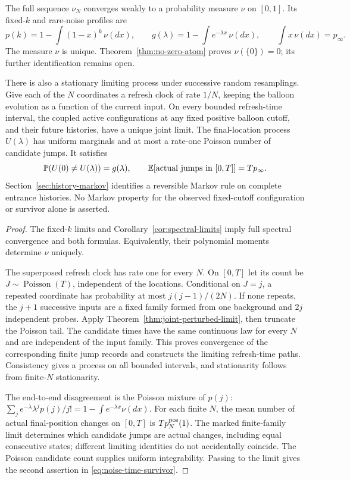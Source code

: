 \documentclass[11pt,letterpaper]{article}
\newcommand{\PP}{\mathbb P}\newcommand{\EE}{\mathbb E}
\begin{document}
\begin{corollary}
\label{cor:noise-evolution}
The full sequence $\nu_N$ converges weakly to a probability measure
$\nu$ on $[0,1]$. Its fixed-$k$ and rare-noise profiles are
\[
 p(k)=1-\int(1-x)^k\,\nu(dx),\qquad
 g(\lambda)=1-\int e^{-\lambda x}\,\nu(dx),\qquad
 \int x\,\nu(dx)=p_\infty.
\]
The measure $\nu$ is unique. Theorem~\ref{thm:no-zero-atom} proves
$\nu(\{0\})=0$; its further identification remains open.

There is also a stationary limiting process under successive random
resamplings. Give each of the $N$ coordinates a refresh clock of rate
$1/N$, keeping the balloon evolution as a function of the current
input. On every bounded refresh-time interval, the coupled active
configurations at any fixed positive balloon cutoff, and their future
histories, have a unique joint limit. The final-location process
$U(\lambda)$ has uniform marginals and at most a rate-one Poisson
number of candidate jumps. It satisfies
\begin{equation}\label{eq:noise-time-survivor}
 \PP(U(0)\ne U(\lambda))=g(\lambda),\qquad
 \EE[\hbox{actual jumps in }[0,T]]=Tp_\infty.
\end{equation}
Section~\ref{sec:history-markov} identifies a reversible Markov rule
on complete entrance histories. No Markov property for the observed
fixed-cutoff configuration or survivor alone is asserted.
\end{corollary}
\begin{proof}
The fixed-$k$ limits and Corollary~\ref{cor:spectral-limits} imply full
spectral convergence and both formulas. Equivalently, their polynomial
moments determine $\nu$ uniquely.

The superposed refresh clock has rate one for every $N$. On $[0,T]$
let its count be $J\sim\operatorname{Poisson}(T)$, independent of the
locations. Conditional on $J=j$, a repeated coordinate has probability
at most $j(j-1)/(2N)$. If none repeats, the $j+1$ successive inputs
are a fixed family formed from one background and $2j$ independent
probes. Apply Theorem~\ref{thm:joint-perturbed-limit}, then truncate
the Poisson tail. The candidate times have the same continuous law
for every $N$ and are independent of the input family. This proves
convergence of the corresponding finite jump records and constructs
the limiting refresh-time paths. Consistency gives a process on all
bounded intervals, and stationarity follows from finite-$N$ stationarity.

The end-to-end disagreement is the Poisson mixture of $p(j)$:
$\sum_j e^{-\lambda}\lambda^j p(j)/j!
=1-\int e^{-\lambda x}\nu(dx)$. For each finite $N$, the mean number
of actual final-position changes on $[0,T]$ is
$T p_N^{\rm pos}(1)$. The marked finite-family limit determines which
candidate jumps are actual changes, including equal consecutive
states; different limiting identities do not accidentally coincide.
The Poisson candidate count supplies uniform integrability. Passing
to the limit gives the second assertion in
\eqref{eq:noise-time-survivor}.
\end{proof}
\end{document}
